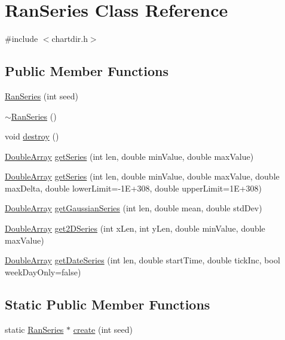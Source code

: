 \hypertarget{class_ran_series}{}\section{Ran\+Series Class Reference}
\label{class_ran_series}


{\ttfamily \#include $<$chartdir.\+h$>$}

\subsection*{Public Member Functions}
\begin{DoxyCompactItemize}
\item 
\hyperlink{class_ran_series_a1fece73522edbaa98df15e97c88f249d}{Ran\+Series} (int seed)
\item 
\hyperlink{class_ran_series_a8c16907ca0d44d9a08d9bc58ec50faf6}{$\sim$\+Ran\+Series} ()
\item 
void \hyperlink{class_ran_series_aa320bcef53d02417fdb78efe9033c29d}{destroy} ()
\item 
\hyperlink{class_double_array}{Double\+Array} \hyperlink{class_ran_series_a2bfeae67f518cc2273f8aa3d8e6c8408}{get\+Series} (int len, double min\+Value, double max\+Value)
\item 
\hyperlink{class_double_array}{Double\+Array} \hyperlink{class_ran_series_a0bab27ee1b15bf4d19d7c4b14fd975de}{get\+Series} (int len, double min\+Value, double max\+Value, double max\+Delta, double lower\+Limit=-\/1\+E+308, double upper\+Limit=1\+E+308)
\item 
\hyperlink{class_double_array}{Double\+Array} \hyperlink{class_ran_series_ac538aef12148303005ef6af6a882af88}{get\+Gaussian\+Series} (int len, double mean, double std\+Dev)
\item 
\hyperlink{class_double_array}{Double\+Array} \hyperlink{class_ran_series_abfabe60593b246b272936f3e74a73673}{get2\+D\+Series} (int x\+Len, int y\+Len, double min\+Value, double max\+Value)
\item 
\hyperlink{class_double_array}{Double\+Array} \hyperlink{class_ran_series_a513311c8a995b7fd8885f89f90ea33d8}{get\+Date\+Series} (int len, double start\+Time, double tick\+Inc, bool week\+Day\+Only=false)
\end{DoxyCompactItemize}
\subsection*{Static Public Member Functions}
\begin{DoxyCompactItemize}
\item 
static \hyperlink{class_ran_series}{Ran\+Series} $\ast$ \hyperlink{class_ran_series_afddf071c89ed954534354ab536ccaf9a}{create} (int seed)
\end{DoxyCompactItemize}


